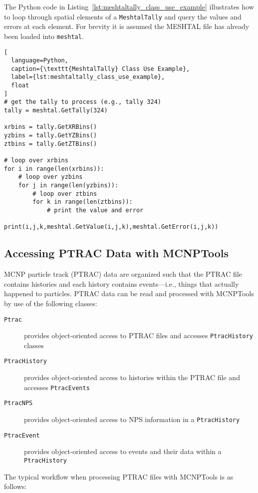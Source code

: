 \documentclass[11pt]{article}
\begin{document}
The Python code in Listing~\ref{lst:meshtaltally_class_use_example} illustrates
how to loop through spatial elements of a \texttt{MeshtalTally} and query the
values and errors at each element. For brevity it is assumed the MESHTAL file
has already been loaded into \texttt{meshtal}.

\begin{lstlisting}[
  language=Python,
  caption={\texttt{MeshtalTally} Class Use Example},
  label={lst:meshtaltally_class_use_example},
  float
]
# get the tally to process (e.g., tally 324)
tally = meshtal.GetTally(324)

xrbins = tally.GetXRBins()
yzbins = tally.GetYZBins()
ztbins = tally.GetZTBins()

# loop over xrbins
for i in range(len(xrbins)):
    # loop over yzbins
    for j in range(len(yzbins)):
        # loop over ztbins
        for k in range(len(ztbins)):
            # print the value and error
            print(i,j,k,meshtal.GetValue(i,j,k),meshtal.GetError(i,j,k))
\end{lstlisting}

\subsection{Accessing PTRAC Data with MCNPTools}\label{accessing-ptrac-data-with-mcnptools}

MCNP particle track (PTRAC) data are organized such that the PTRAC file contains
histories and each history contains events---i.e., things that actually happened
to particles. PTRAC data can be read and processed with MCNPTools by use of the
following classes:

\begin{description}
  \item[\texttt{Ptrac}] provides object-oriented access to PTRAC files and accesses \texttt{PtracHistory} classes
  \item[\texttt{PtracHistory}] provides object-oriented access to histories within the PTRAC file and accesses \texttt{PtracEvents}
  \item[\texttt{PtracNPS}] provides object-oriented access to NPS information in a \texttt{PtracHistory}
  \item[\texttt{PtracEvent}] provides object-oriented access to events and their data within a \texttt{PtracHistory}
\end{description}

The typical workflow when processing PTRAC files with MCNPTools is as follows:
\end{document}
